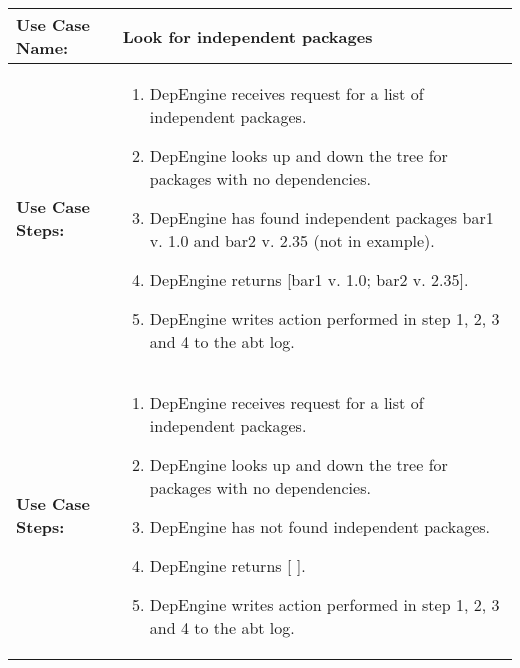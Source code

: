 
\begin{tabularx}{\linewidth}{|l|X|}
\hline
\textbf{Use Case Name:} & \textbf{Look for independent packages} \\
\hline
\textbf{Use Case Steps:} & 
\begin{minipage}{\linewidth} 
 \vspace{0.05em}
  \begin{enumerate}
   \item DepEngine receives request for a list of independent packages.
   \item DepEngine looks up and down the tree for packages with no dependencies.
   \item DepEngine has found independent packages bar1 v. 1.0 and bar2 v. 2.35 (not in example).
   \item DepEngine returns [bar1 v. 1.0; bar2 v. 2.35].
   \item DepEngine writes action performed in step 1, 2, 3 and 4 to the abt log.
  \end{enumerate}
 \vspace{0.05em}
\end{minipage}
\\
\hline 
\textbf{Use Case Steps:} & 
\begin{minipage}{\linewidth} 
 \vspace{0.05em}
  \begin{enumerate}
   \item DepEngine receives request for a list of independent packages.
   \item DepEngine looks up and down the tree for packages with no dependencies.
   \item DepEngine has not found independent packages.
   \item DepEngine returns [ ].
   \item DepEngine writes action performed in step 1, 2, 3 and 4 to the abt log.
  \end{enumerate}
 \vspace{0.05em}
\end{minipage}
\\
\hline
\end{tabularx}


